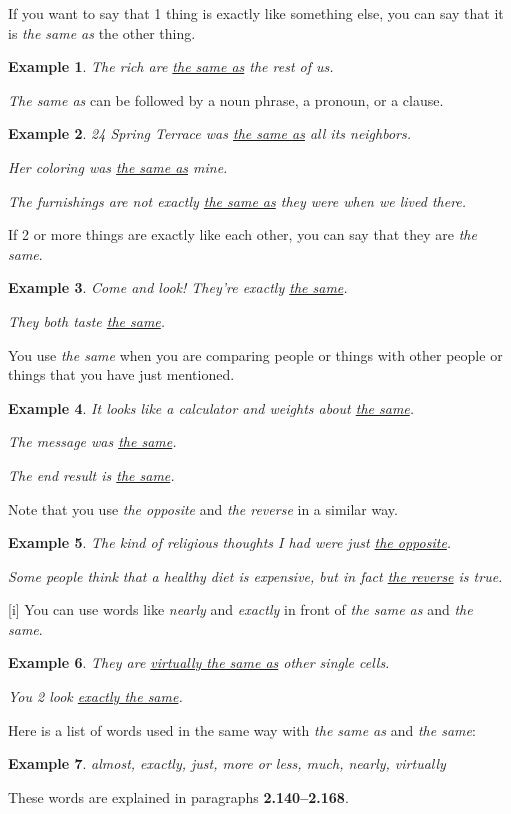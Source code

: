 \documentclass[oneside]{book}
\numberwithin{equation}{section}
\newtheorem{example}{Example}[section]
\begin{document}
%
\noindent{} If you want to say that 1 thing is exactly like something else, you can say that it is \textit{the same as} the other thing.
\begin{example}
    The rich are \underline{the same as} the rest of us.
\end{example}
\textit{The same as} can be followed by a noun phrase, a pronoun, or a clause.
\begin{example}
    24 Spring Terrace was \underline{the same as} all its neighbors.
    
    Her coloring was \underline{the same as} mine.
    
    The furnishings are not exactly \underline{the same as} they were when we lived there.
\end{example}
If 2 or more things are exactly like each other, you can say that they are \textit{the same}.
\begin{example}
    Come and look! They're exactly \underline{the same}.
    
    They both taste \underline{the same}.
\end{example}
You use \textit{the same} when you are comparing people or things with other people or things that you have just mentioned.
\begin{example}
    It looks like a calculator and weights about \underline{the same}.
    
    The message was \underline{the same}.
    
    The end result is \underline{the same}.
\end{example}
Note that you use \textit{the opposite} and \textit{the reverse} in a similar way.
\begin{example}
    The kind of religious thoughts I had were just \underline{the opposite}.
    
    Some people think that a healthy diet is expensive, but in fact \underline{the reverse} is true.
\end{example}
%
\noindent{} [i] You can use words like \textit{nearly} and \textit{exactly} in front of \textit{the same as} and \textit{the same}.
\begin{example}
    They are \underline{virtually the same as} other single cells.
    
    You 2 look \underline{exactly the same}.
\end{example}
Here is a list of words used in the same way with \textit{the same as} and \textit{the same}:
\begin{example}
    almost, exactly, just, more or less, much, nearly, virtually
\end{example}
These words are explained in paragraphs \textbf{2.140--2.168}.
\end{document}
